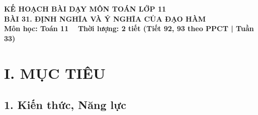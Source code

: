 \documentclass[12pt, a4paper]{article}
\begin{document}
\begin{center}
    {\fontsize{14pt}{17pt}\selectfont \textbf{KẾ HOẠCH BÀI DẠY MÔN TOÁN LỚP 11}}\\[6pt]
    {\fontsize{16pt}{19pt}\selectfont \textbf{BÀI 31. ĐỊNH NGHĨA VÀ Ý NGHĨA CỦA ĐẠO HÀM}}\\[4pt]
    {\fontsize{12pt}{15pt}\selectfont \textbf{Môn học: Toán 11} \ \textbar \ \textbf{Thời lượng: 2 tiết (Tiết 92, 93 theo PPCT | Tuần 33)}}
\end{center}

\vspace{5pt}

\section*{I. MỤC TIÊU}

\subsection*{1. Kiến thức, Năng lực}
\end{document}
